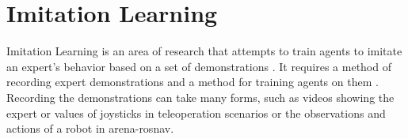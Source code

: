 \section{Imitation Learning}
Imitation Learning is an area of research that attempts to train agents to imitate an expert’s behavior based on a set of demonstrations \citep{abbeel}. It requires a method of recording expert demonstrations and a method for training agents on them \citep{abbeel}. Recording the demonstrations can take many forms, such as videos showing the expert or values of joysticks in teleoperation scenarios \citep{abbeel} or the observations and actions of a robot in arena-rosnav.
